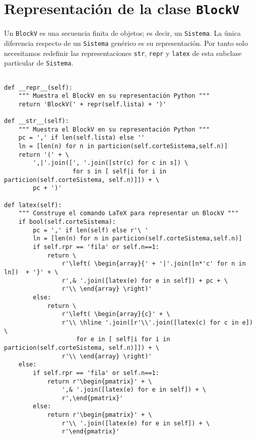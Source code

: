\documentclass[11pt]{report}
\begin{document}
\section{Representación de la clase \texttt{BlockV}}
\label{sec:org9da3629}
Un \texttt{BlockV} es una secuencia finita de objetos; es decir, un
\texttt{Sistema}.  La única diferencia respecto de un \texttt{Sistema} genérico es
su representación. Por tanto solo necesitamos redefinir las
representaciones \texttt{str}, \texttt{repr} y \texttt{latex} de esta subclase particular
de \texttt{Sistema}.

\begin{verbatim}

def __repr__(self):
    """ Muestra el BlockV en su representación Python """
    return 'BlockV(' + repr(self.lista) + ')'
                           
def __str__(self):
    """ Muestra el BlockV en su representación Python """
    pc = ',' if len(self.lista) else ''
    ln = [len(n) for n in particion(self.corteSistema,self.n)]
    return '(' + \
        ',|'.join([', '.join([str(c) for c in s]) \
                   for s in [ self|i for i in particion(self.corteSistema, self.n)]]) + \
        pc + ')'

def latex(self):
    """ Construye el comando LaTeX para representar un BlockV """
    if bool(self.corteSistema):
        pc = ',' if len(self) else r'\ '
        ln = [len(n) for n in particion(self.corteSistema,self.n)]
        if self.rpr == 'fila' or self.n==1:    
            return \
                r'\left( \begin{array}{' + '|'.join([n*'c' for n in ln])  + '}' + \
                r',& '.join([latex(e) for e in self]) + pc + \
                r'\\ \end{array} \right)'
        else:
            return \
                r'\left( \begin{array}{c}' + \
                r'\\ \hline '.join([r'\\'.join([latex(c) for c in e]) \
                    for e in [ self|i for i in particion(self.corteSistema, self.n)]]) + \
                r'\\ \end{array} \right)'
    else:
        if self.rpr == 'fila' or self.n==1:
            return r'\begin{pmatrix}' + \
                ',& '.join([latex(e) for e in self]) + \
                r',\end{pmatrix}'
        else:
            return r'\begin{pmatrix}' + \
                r'\\ '.join([latex(e) for e in self]) + \
                r'\end{pmatrix}'

\end{verbatim}
\end{document}
